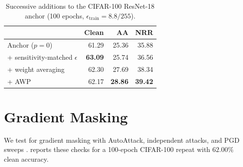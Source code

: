 \documentclass{article} %
\theoremstyle{plain}
\begin{document}
\begin{table}[!htbp]
  \centering \small \setlength{\tabcolsep}{5pt}
  \caption{Successive additions to the CIFAR-100 ResNet-18 anchor (100 epochs,
  $\epsilon_{\mathrm{train}}=8.8/255$).}
  \label{tab:ladder}
  \begin{tabular}{lrrr}
    \toprule
    & Clean & AA & NRR \\
    \midrule
    Anchor ($p=0$)                         & 61.29 & 25.36 & 35.88 \\
    \quad + sensitivity-matched $\epsilon$ & \textbf{63.09} & 25.74 & 36.56 \\
    \quad + weight averaging               & 62.30 & 27.69 & 38.34 \\
    \quad + AWP                            & 62.17 & \textbf{28.86} & \textbf{39.42} \\
    \bottomrule
  \end{tabular}
\end{table}

\section{Gradient Masking}
\label{app:gradmask}

We test for gradient masking with AutoAttack, independent attacks, and PGD sweeps
\citep{athalye2018obfuscated}.  reports these checks for a 100-epoch CIFAR-100
repeat with $62.00\%$ clean accuracy.
\end{document}
